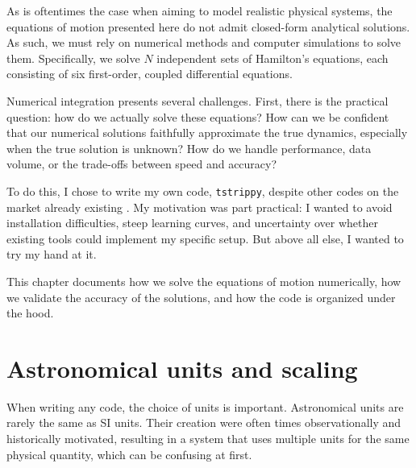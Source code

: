 As is oftentimes the case when aiming to model realistic physical systems, the equations of motion presented here do not admit closed-form analytical solutions. As such, we must rely on numerical methods and computer simulations to solve them. Specifically, we solve $N$ independent sets of Hamilton's equations, each consisting of six first-order, coupled differential equations.

Numerical integration presents several challenges. First, there is the practical question: how do we actually solve these equations? How can we be confident that our numerical solutions faithfully approximate the true dynamics, especially when the true solution is unknown? How do we handle performance, data volume, or the trade-offs between speed and accuracy?

To do this, I chose to write my own code, \texttt{tstrippy}, despite other codes on the market already existing \citep{2013A&A...557A..84P,2015ApJS..216...29B,2015MNRAS.450.4070W,2017JOSS....2..388P,2018arXiv180208255V}. My motivation was part practical: I wanted to avoid installation difficulties, steep learning curves, and uncertainty over whether existing tools could implement my specific setup. But above all else, I wanted to try my hand at it.  

This chapter documents how we solve the equations of motion numerically, how we validate the accuracy of the solutions, and how the code is organized under the hood.

\section{Astronomical units and scaling}
    When writing any code, the choice of units is important. Astronomical units are rarely the same as SI units. Their creation were often times observationally and historically motivated, resulting in a system that uses multiple units for the same physical quantity, which can be confusing at first.

